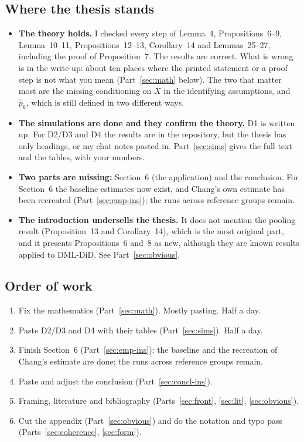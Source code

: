 \documentclass[11pt]{article}
\theoremstyle{plain}
\theoremstyle{remark}
\begin{document}
\subsection{Where the thesis stands}
\begin{itemize}
\item \textbf{The theory holds.} I checked every step of Lemma~4,
  Propositions~6--9, Lemma~10--11, Propositions~12--13, Corollary~14 and
  Lemmas~25--27, including the proof of Proposition~7. The results are correct.
  What is wrong is in the write-up: about ten places where the printed statement
  or a proof step is not what you mean (Part~\ref{sec:math} below). The two
  that matter most are the missing conditioning on $X$ in the identifying
  assumptions, and $\hat p_k$, which is still defined in two different ways.
\item \textbf{The simulations are done and they confirm the theory.} D1 is
  written up. For D2/D3 and D4 the results are in the repository, but the thesis
  has only headings, or my chat notes pasted in. Part~\ref{sec:sims} gives
  the full text and the tables, with your numbers.
\item \textbf{Two parts are missing:} Section~6 (the application) and the
  conclusion. For Section~6 the baseline estimates now exist, and Chang's own
  estimate has been recreated (Part~\ref{sec:emp-ins}); the runs across reference
  groups remain.
\item \textbf{The introduction undersells the thesis.} It does not mention the
  pooling result (Proposition~13 and Corollary~14), which is the most original
  part, and it presents Propositions~6 and~8 as new, although they are known
  results applied to DML-DiD. See Part~\ref{sec:obvious}.
\end{itemize}

\subsection{Order of work}
\begin{enumerate}
\item Fix the mathematics (Part~\ref{sec:math}). Mostly pasting. Half a day.
\item Paste D2/D3 and D4 with their tables (Part~\ref{sec:sims}). Half a day.
\item Finish Section~6 (Part~\ref{sec:emp-ins}): the baseline and the recreation
  of Chang's estimate are done; the runs across reference groups remain.
\item Paste and adjust the conclusion (Part~\ref{sec:concl-ins}).
\item Framing, literature and bibliography (Parts~\ref{sec:front},
  \ref{sec:lit}, \ref{sec:obvious}).
\item Cut the appendix (Part~\ref{sec:obvious}) and do the notation and typo
  pass (Parts~\ref{sec:coherence}, \ref{sec:form}).
\end{enumerate}
\end{document}
